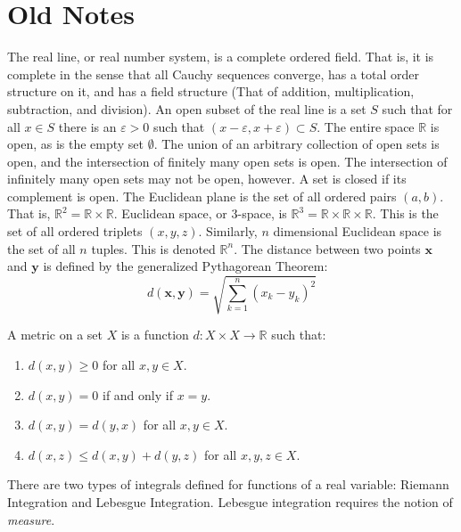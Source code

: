 \documentclass[crop=false,class=book,oneside]{standalone}
\begin{document}
    \section{Old Notes}
        The real line, or real number system, is a complete ordered
        field. That is, it is complete in the sense that all
        Cauchy sequences converge, has a total order structure
        on it, and has a field structure (That of addition,
        multiplication, subtraction, and division).
        An open subset of the real line is a set $S$ such that
        for all $x\in{S}$ there is an $\varepsilon>0$ such that
        $(x-\varepsilon,x+\varepsilon)\subset{S}$. The entire
        space $\mathbb{R}$ is open, as is the empty set
        $\emptyset$. The union of
        an arbitrary collection of open sets is open, and the
        intersection of finitely many open sets is open. The
        intersection of infinitely many open sets may not be
        open, however. A set is closed if its complement is
        open. The Euclidean plane is the set of all ordered
        pairs $(a,b)$. That is,
        $\mathbb{R}^{2}=\mathbb{R}\times\mathbb{R}$. Euclidean
        space, or 3-space, is
        $\mathbb{R}^{3}=\mathbb{R}\times\mathbb{R}\times\mathbb{R}$.
        This is the set of all ordered triplets $(x,y,z)$. Similarly,
        $n$ dimensional Euclidean space is the set of all
        $n$ tuples. This is denoted $\mathbb{R}^{n}$. The distance
        between two points $\mathbf{x}$ and $\mathbf{y}$ is defined
        by the generalized Pythagorean Theorem:
        \begin{equation*}
            d(\mathbf{x},\mathbf{y})=
            \sqrt{\sum_{k=1}^{n}(x_{k}-y_{k})^{2}}
        \end{equation*}
        \begin{definition}
            A metric on a set $X$ is a function
            $d:X\times{X}\rightarrow\mathbb{R}$ such that:
            \begin{enumerate}
                \item $d(x,y)\geq{0}$ for all $x,y\in{X}$.
                \item $d(x,y)=0$ if and only if $x=y$.
                \item $d(x,y)=d(y,x)$ for all $x,y\in{X}$.
                \item $d(x,z)\leq{d(x,y)+d(y,z)}$
                      for all $x,y,z\in{X}$.
            \end{enumerate}
        \end{definition}
        There are two types of integrals defined for functions
        of a real variable: Riemann Integration and Lebesgue Integration.
        Lebesgue integration requires the notion of \textit{measure}.
\end{document}
